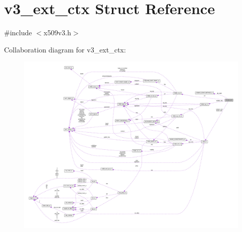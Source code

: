 \hypertarget{structv3__ext__ctx}{}\section{v3\+\_\+ext\+\_\+ctx Struct Reference}
\label{structv3__ext__ctx}


{\ttfamily \#include $<$x509v3.\+h$>$}



Collaboration diagram for v3\+\_\+ext\+\_\+ctx\+:
\nopagebreak
\begin{figure}[H]
\begin{center}
\leavevmode
\includegraphics[width=350pt]{structv3__ext__ctx__coll__graph}
\end{center}
\end{figure}
